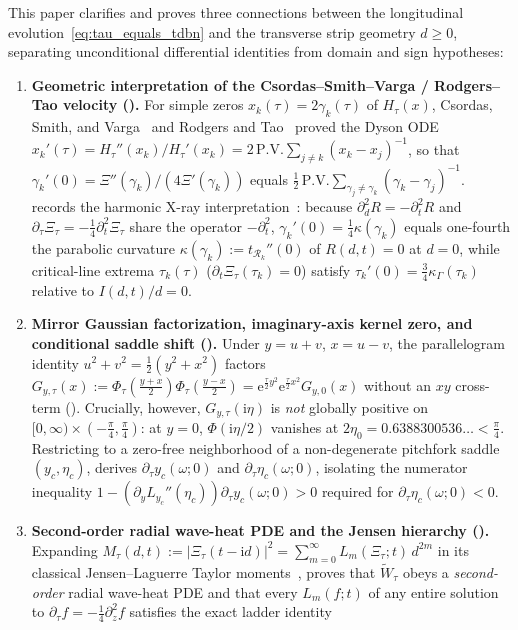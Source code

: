 \documentclass[11pt,reqno]{amsart}
\theoremstyle{plain}
\theoremstyle{definition}
\theoremstyle{remark}
\numberwithin{equation}{section}
\newcommand{\ii}{\mathrm{i}}
\newcommand{\ee}{\mathrm{e}}
\newcommand{\PV}{\mathrm{P.V.}}
\begin{document}
This paper clarifies and proves three connections between the longitudinal evolution~\eqref{eq:tau_equals_tdbn} and the transverse strip geometry $d \ge 0$, separating unconditional differential identities from domain and sign hypotheses:
\begin{enumerate}[label=\textup{(\arabic*)},leftmargin=2.2em]
\item \textbf{Geometric interpretation of the Csordas--Smith--Varga / Rodgers--Tao velocity ().} For simple zeros $x_k(\tau) = 2\gamma_k(\tau)$ of $H_\tau(x)$, Csordas, Smith, and Varga~\cite{csordas1994} and Rodgers and Tao~\cite{rodgerstao2020} proved the Dyson ODE $x_k'(\tau) = H_\tau''(x_k)/H_\tau'(x_k) = 2\,\PV\sum_{j\neq k}(x_k - x_j)^{-1}$, so that $\gamma_k'(0) = \Xi''(\gamma_k)/(4\Xi'(\gamma_k))$ equals $\frac{1}{2}\,\PV\sum_{\gamma_j\neq\gamma_k}(\gamma_k - \gamma_j)^{-1}$.  records the harmonic X-ray interpretation~\cite{speiser1934,ariasdereyna2003}: because $\partial_d^2 R = -\partial_t^2 R$ and $\partial_\tau\Xi_\tau = -\frac{1}{4}\partial_t^2\Xi_\tau$ share the operator $-\partial_t^2$, $\gamma_k'(0) = \frac{1}{4}\kappa(\gamma_k)$ equals one-fourth the parabolic curvature $\kappa(\gamma_k) := t_{\mathcal{R}_k}''(0)$ of $R(d,t) = 0$ at $d = 0$, while critical-line extrema $\tau_k(\tau)$ ($\partial_t\Xi_\tau(\tau_k) = 0$) satisfy $\tau_k'(0) = \frac{3}{4}\kappa_\Gamma(\tau_k)$ relative to $I(d,t)/d = 0$.
\item \textbf{Mirror Gaussian factorization, imaginary-axis kernel zero, and conditional saddle shift ().} Under $y = u + v$, $x = u - v$, the parallelogram identity $u^2 + v^2 = \frac{1}{2}(y^2 + x^2)$ factors $G_{y,\tau}(x) := \Phi_\tau(\frac{y+x}{2})\Phi_\tau(\frac{y-x}{2}) = \ee^{\frac{\tau}{2}y^2}\ee^{\frac{\tau}{2}x^2}G_{y,0}(x)$ without an $xy$ cross-term (). Crucially, however, $G_{y,\tau}(\ii\eta)$ is \emph{not} globally positive on $[0,\infty) \times (-\frac{\pi}{4}, \frac{\pi}{4})$: at $y = 0$, $\Phi(\ii\eta/2)$ vanishes at $2\eta_0 = 0.6388300536\dots < \frac{\pi}{4}$. Restricting to a zero-free neighborhood of a non-degenerate pitchfork saddle $(y_c, \eta_c)$,  derives $\partial_\tau y_c(\omega; 0)$ and $\partial_\tau\eta_c(\omega; 0)$, isolating the numerator inequality $1 - (\partial_y L_{y_c}''(\eta_c))\partial_\tau y_c(\omega; 0) > 0$ required for $\partial_\tau\eta_c(\omega; 0) < 0$.
\item \textbf{Second-order radial wave-heat PDE and the Jensen hierarchy ().} Expanding $M_\tau(d,t) := \lvert\Xi_\tau(t - \ii d)\rvert^2 = \sum_{m=0}^\infty L_m(\Xi_\tau; t)\,d^{2m}$ in its classical Jensen--Laguerre Taylor moments~\cite{jensen1913,cravencsordas1989},  proves that $\widetilde{W}_\tau$ obeys a \emph{second-order} radial wave-heat PDE and that every $L_m(f; t)$ of any entire solution to $\partial_\tau f = -\frac{1}{4}\partial_z^2 f$ satisfies the exact ladder identity

\end{enumerate}
\end{document}
